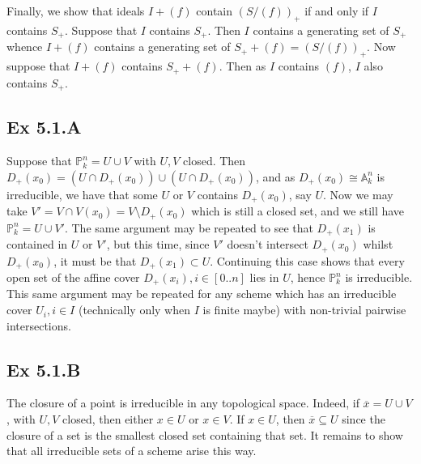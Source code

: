 \documentclass{article}
\theoremstyle{definition}
\renewcommand{\P}{\mathbb{P}}
\newcommand{\A}{\mathbb{A}}
\begin{document}
Finally, we show that ideals $I + (f)$ contain $(S/(f))_{+}$ if and only if $I$
contains $S_{+}$. Suppose that $I$ contains $S_{+}$. Then $I$ contains a
generating set of $S_{+}$ whence $I + (f)$ contains a generating set of $S_{+}
+ (f) = (S/(f))_{+}$. Now suppose that $I + (f)$ contains $S_{+} + (f)$. Then
as $I$ contains $(f)$, $I$ also contains $S_{+}$.

\subsection*{Ex 5.1.A}

Suppose that $\P^{n}_k = U \cup V$ with $U, V$ closed. Then $D_{+}(x_0) = (U
\cap D_{+}(x_0)) \cup (U \cap D_{+}(x_0))$, and as $D_{+}(x_0) \cong
\A^{n}_{k}$ is irreducible, we have that some $U$ or $V$ contains $D_{+}(x_0)$,
say $U$. Now we may take $V' = V \cap V(x_0) = V \setminus D_{+}(x_0)$ which is
still a closed set, and we still have $\P^{n}_{k} = U \cup V'$. The same
argument may be repeated to see that $D_{+}(x_1)$ is contained in $U$ or $V'$,
but this time, since $V'$ doesn't intersect $D_{+}(x_0)$ whilst $D_{+}(x_0)$,
it must be that $D_{+}(x_1) \subset U$. Continuing this case shows that every
open set of the affine cover $D_{+}(x_i), i \in [0..n]$ lies in $U$, hence
$\P^{n}_{k}$ is irreducible. \\

This same argument may be repeated for any scheme which has an irreducible
cover $U_i, i \in I$ (technically only when $I$ is finite maybe) with
non-trivial pairwise intersections.

\subsection*{Ex 5.1.B}

The closure of a point is irreducible in any topological space. Indeed, if
$\overline{x} = U \cup V$, with $U, V$ closed, then either $x \in U$ or $x \in
V$. If $x \in U$, then $\overline{x} \subseteq U$ since the closure of a set is
the smallest closed set containing that set. It remains to show that all
irreducible sets of a scheme arise this way. \\
\end{document}
